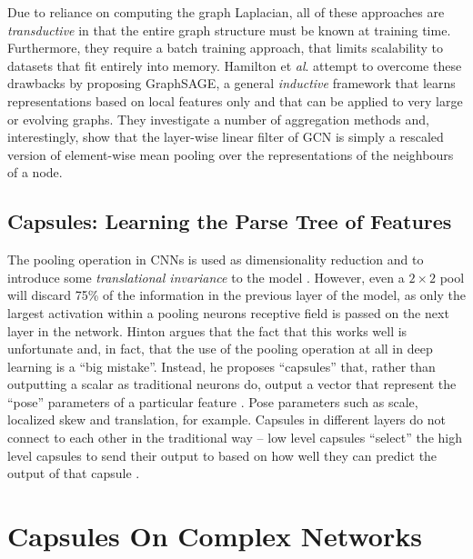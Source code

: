 \documentclass{IEEEtran}
\begin{document}
	Due to reliance on computing the graph Laplacian, all of these approaches are \textit{transductive} in that the entire graph structure must be known at training time. Furthermore, they require a batch training approach, that limits scalability to datasets that fit entirely into memory. 
	Hamilton et \textit{al}. \cite{hamilton2017inductive} attempt to overcome these drawbacks by proposing GraphSAGE, a general \textit{inductive} framework that learns representations based on local features only and that can be applied to very large or evolving graphs. 
	They investigate a number of aggregation methods and, interestingly, show that the layer-wise linear filter of GCN is simply a rescaled version of element-wise mean pooling over the representations of the neighbours of a node.
	
	
		
	
	\subsection{Capsules: Learning the Parse Tree of Features}
	The pooling operation in CNNs is used as dimensionality reduction and to introduce some \textit{translational invariance} to the model \cite{krizhevsky2012imagenet}. 
	However, even a $2\times2$ pool will discard 75\% of the information in the previous layer of the model, as only the largest activation within a pooling neurons receptive field is passed on the next layer in the network.
	Hinton argues that the fact that this works well is unfortunate and, in fact, that the use of the pooling operation at all in deep learning is a ``big mistake''.
	Instead, he proposes ``capsules'' that, rather than outputting a scalar as traditional neurons do, output a vector that represent the ``pose'' parameters of a particular feature \cite{hinton2011transforming}.
	Pose parameters such as scale, localized skew and translation, for example. 
	Capsules in different layers do not connect to each other in the traditional way -- low level capsules ``select'' the high level capsules to send their output to based on how well they can predict the output of that capsule \cite{sabour2017dynamic}. 
	
	
	
	\section{Capsules On Complex Networks}
	
\end{document}
